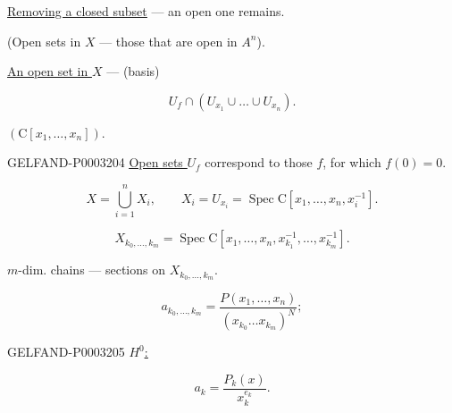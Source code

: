\uline{\uline{Removing a closed subset}} --- an open one remains.


(Open sets in $X$ --- those that are open in $A^n$).

\uline{An open set in $X$} --- (basis)

\begin{equation*}U_f\cap (U_{x_1}\cup\ldots\cup U_{x_n}).\end{equation*}

$(\mathrm C[x_1,\ldots, x_n])$.

\begin{GelfandAdjacentEvidence}{GELFAND-P000320}{4}
\uline{\uline{Open sets $U_f$}} correspond to those $f$, for which \uline{\uline{$f (0)=0$}}.

\end{GelfandAdjacentEvidence}


\begin{equation*}X=\bigcup_{i=1}^n X_i,\qquad X_i=U_{x_i}=\operatorname{Spec}\mathrm C[x_1,\ldots, x_n, x_i^{-1}].\end{equation*}

\begin{equation*}X_{k_0,\ldots, k_m}=\operatorname{Spec}\mathrm C[x_1,\ldots, x_n, x_{k_1}^{-1},\ldots, x_{k_m}^{-1}].\end{equation*}





$m$-dim. chains --- sections on $X_{k_0,\ldots, k_m}$.

\begin{equation*}a_{k_0,\ldots, k_m}=\frac{P (x_1,\ldots, x_n)}{(x_{k_0}\ldots x_{k_m})^N};\end{equation*}

\begin{GelfandAdjacentEvidence}{GELFAND-P000320}{5}
\uline{\uline{$H^0$:}}

\end{GelfandAdjacentEvidence}


\begin{equation*}a_k=\frac{P_k (x)}{x_k^{e_k}}.\end{equation*}






